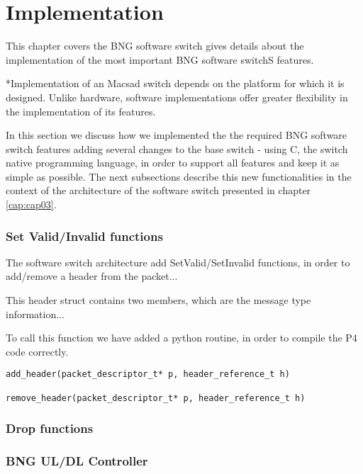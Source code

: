 \chapter{Implementation}
\label{cap:cap04}

This chapter covers the BNG software switch gives details about the implementation of the most important BNG software switchS features.

*Implementation of an Macsad switch depends on the platform for which it is designed. Unlike hardware, software implementations offer greater flexibility in the implementation of its features. %

In this section we discuss how we implemented the the required BNG software switch features adding several changes to the base switch - using C, the switch native programming language, in order to support all features and keep it as simple as possible. The next subsections describe this new functionalities in the context of the architecture of the software switch presented in chapter \ref{cap:cap03}.

\subsection{Set Valid/Invalid functions}
\label{sec:sec41}

The software switch architecture add SetValid/SetInvalid functions, in order to add/remove a header from the packet...  

This header struct contains two members, which are the message type information... 

 

%


To call this function we have added a python routine, in order to compile the P4 code correctly.

\begin{lstlisting}[caption={Add header/ Remove header base functions}, label=msgpackunpack,]
add_header(packet_descriptor_t* p, header_reference_t h)

remove_header(packet_descriptor_t* p, header_reference_t h)
\end{lstlisting}


\subsection{Drop functions}


\subsection{BNG UL/DL Controller }





 